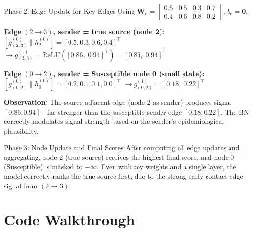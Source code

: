 \begin{examplebox}{Phase 2: Edge Update for Key Edges}
Using $\mathbf{W}_e = \begin{bmatrix}0.5&0.5&0.3&0.7\\0.4&0.6&0.8&0.2\end{bmatrix}$, $b_e=\mathbf{0}$.

\textbf{Edge $(2 \to 3)$, sender = true source (node 2):}
$[g_{(2,3)}^{(0)} \| h_2^{(0)}] = [0.5, 0.3, 0.6, 0.4]^\top$
$\to g_{(2,3)}^{(1)} = \text{ReLU}([0.86,\; 0.94]^\top) = [0.86,\; 0.94]^\top$

\textbf{Edge $(0 \to 2)$, sender = Susceptible node 0 (small state):}
$[g_{(0,2)}^{(0)} \| h_0^{(0)}] = [0.2, 0.1, 0.1, 0.0]^\top$
$\to g_{(0,2)}^{(1)} = [0.18,\; 0.22]^\top$

\textbf{Observation:} The source-adjacent edge (node 2 as sender) produces signal $[0.86, 0.94]$---far stronger than the susceptible-sender edge $[0.18, 0.22]$. The BN correctly modulates signal strength based on the sender's epidemiological plausibility.
\end{examplebox}

\begin{examplebox}{Phase 3: Node Update and Final Scores}
After computing all edge updates and aggregating, node 2 (true source) receives the highest final score, and node 0 (Susceptible) is masked to $-\infty$. Even with toy weights and a single layer, the model correctly ranks the true source first, due to the strong early-contact edge signal from $(2 \to 3)$.
\end{examplebox}

\section{Code Walkthrough}

